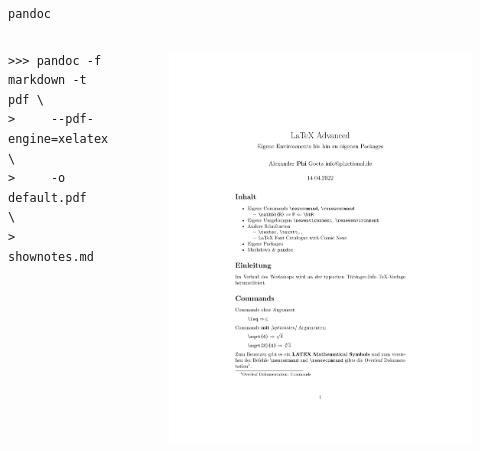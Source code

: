 \documentclass[14pt,aspectratio=169]{beamer}
\begin{document}
\begin{frame}[fragile]{\texttt{pandoc}}
    \begin{columns}
        
        \begin{Beispiel}[\faMarkdown\faArrowRight\faFilePdf]
            \begin{verbatim}
>>> pandoc -f markdown -t pdf \
>     --pdf-engine=xelatex    \
>     -o default.pdf          \
>     shownotes.md
            \end{verbatim}
        \end{Beispiel}
    
    
        
        \vspace{-7em}
        \begin{figure}
            \includegraphics[page=1,height=1.2\textheight]{pictures/default.pdf}
        \end{figure}
    \end{columns}
\end{frame}
\end{document}
